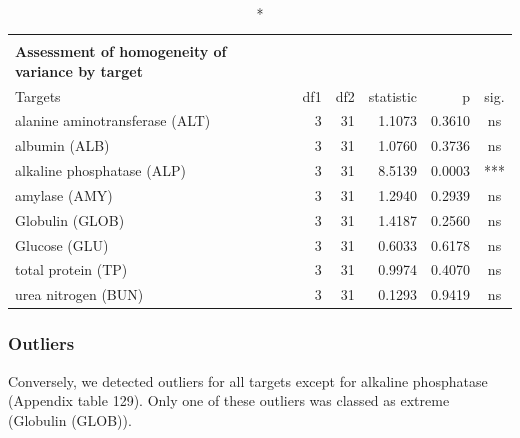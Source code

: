 \documentclass[
  12pt,
  letterpaper,
]{article}
\begin{document}
\begingroup
\fontsize{12.0pt}{14.4pt}\selectfont
\begin{longtable}{l|rrrrc}
\caption*{
{\large \textbf{Appendix Table 128}} \\ 
{\small \textbf{Assessment of homogeneity of variance by target}}
} \\ 
\toprule
Targets & {df1} & {df2} & {statistic} & {p} & {sig.} \\ 
\midrule\addlinespace[2.5pt]
alanine aminotransferase (ALT) & 3 & 31 & 1.1073 & 0.3610 & ns \\ 
albumin (ALB) & 3 & 31 & 1.0760 & 0.3736 & ns \\ 
alkaline phosphatase (ALP) & 3 & 31 & 8.5139 & 0.0003 & *** \\ 
amylase (AMY) & 3 & 31 & 1.2940 & 0.2939 & ns \\ 
Globulin (GLOB) & 3 & 31 & 1.4187 & 0.2560 & ns \\ 
Glucose (GLU) & 3 & 31 & 0.6033 & 0.6178 & ns \\ 
total protein (TP) & 3 & 31 & 0.9974 & 0.4070 & ns \\ 
urea nitrogen (BUN) & 3 & 31 & 0.1293 & 0.9419 & ns \\ 
\bottomrule
\end{longtable}
\endgroup

\subsubsection{Outliers}\label{outliers-3}

Conversely, we detected outliers for all targets except for alkaline phosphatase (Appendix table 129). Only one of these outliers was classed as extreme (Globulin (GLOB)).
\end{document}

